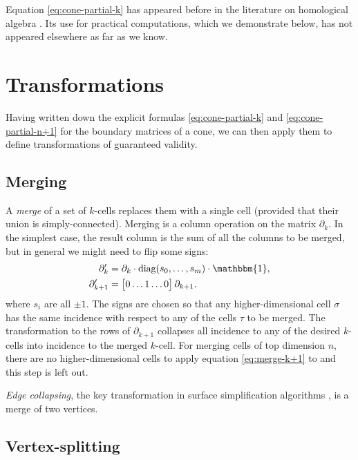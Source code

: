 \documentclass[twocolumn]{article}
\begin{document}
Equation \eqref{eq:cone-partial-k} has appeared before in the literature on homological algebra \cite{gelfand1994homological}.
Its use for practical computations, which we demonstrate below, has not appeared elsewhere as far as we know.


\section{Transformations}

Having written down the explicit formulas \eqref{eq:cone-partial-k} and \eqref{eq:cone-partial-n+1} for the boundary matrices of a cone, we can then apply them to define transformations of guaranteed validity.

\subsection{Merging}

A \emph{merge} of a set of $k$-cells replaces them with a single cell (provided that their union is simply-connected).
Merging is a column operation on the matrix $\partial_k$.
In the simplest case, the result column is the sum of all the columns to be merged, but in general we might need to flip some signs:
\begin{align}
    \partial_k' & = \partial_k\cdot\text{diag}(s_0, \ldots, s_m)\cdot\mathbbm{1}, \\
    \partial_{k + 1}' & = \left[\begin{matrix} 0 \ldots 1 \ldots 0\end{matrix}\right]\partial_{k + 1}. \label{eq:merge-k+1}
\end{align}
where $s_i$ are all $\pm 1$.
The signs are chosen so that any higher-dimensional cell $\sigma$ has the same incidence with respect to any of the cells $\tau$ to be merged.
The transformation to the rows of $\partial_{k + 1}$ collapses all incidence to any of the desired $k$-cells into incidence to the merged $k$-cell.
For merging cells of top dimension $n$, there are no higher-dimensional cells to apply equation \eqref{eq:merge-k+1} to and this step is left out.

\emph{Edge collapsing}, the key transformation in surface simplification algorithms \cite{gueziec1995surface}, is a merge of two vertices.

\subsection{Vertex-splitting}
\end{document}
